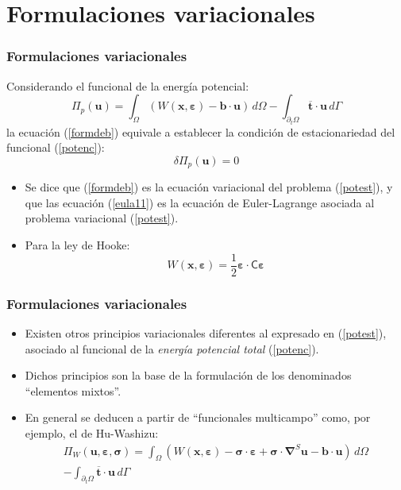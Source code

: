 \documentclass{beamer}
\begin{document}
\section{Formulaciones variacionales}
\begin{frame}
\frametitle{Formulaciones variacionales}
Considerando el funcional de la energía potencial:
\begin{equation}
\Pi_p(\bm{u})=
\int_{\Omega} \left(
W(\bm{x},\bm{\varepsilon})-\bm{b} \cdot \bm{u}\right) \, d \Omega
-\int_{\partial_t \Omega} \overline{\bm{t}}\cdot\bm{u} \, d \Gamma\label{potenc}
\end{equation}
la ecuación (\ref{formdeb}) equivale a establecer la condición de
estacionariedad del funcional (\ref{potenc}):
\begin{equation}
\delta \Pi_p(\bm{u})=0 \label{potest}
\end{equation}
\begin{itemize}
\item Se dice que (\ref{formdeb}) es la ecuación variacional del problema
(\ref{potest}), y que las ecuación (\ref{eula11}) es la ecuación de
Euler-Lagrange asociada al problema variacional (\ref{potest}).
\item Para la ley de Hooke:
\begin{equation}
W(\bm{x},\bm{\varepsilon})=\frac{1}{2} \bm{\varepsilon} \cdot 
\bm{\mathsf{C}} \bm{\varepsilon}
\end{equation}
\end{itemize}
\end{frame}
\begin{frame}
\frametitle{Formulaciones variacionales}
\begin{itemize}
\item Existen otros principios variacionales diferentes al expresado en
(\ref{potest}), asociado al funcional de la {\em energía potencial
total} (\ref{potenc}).
\item Dichos principios son la base de la formulación de
los denominados ``elementos mixtos''.
\item En general se deducen a partir de ``funcionales multicampo'' como,
por ejemplo, el de Hu-Washizu:
\begin{multline*}
\Pi_W(\bm{u},\bm{\varepsilon},\bm{\sigma})=
\int_{\Omega} \left(
W(\bm{x},\bm{\varepsilon})-\bm{\sigma}\cdot\bm{\varepsilon}+
\bm{\sigma}\cdot\bm{\nabla}^{S}\bm{u}-\bm{b} \cdot \bm{u}\right) \, d \Omega \\
-\int_{\partial_t \Omega} \overline{\bm{t}}\cdot\bm{u} \, d \Gamma\label{hu-was}
\end{multline*}
\end{itemize}
\end{frame}
\end{document}
